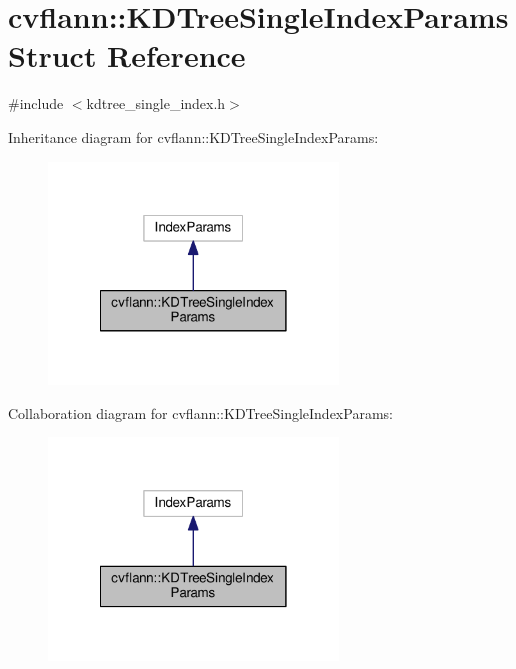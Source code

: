 \hypertarget{structcvflann_1_1KDTreeSingleIndexParams}{\section{cvflann\-:\-:K\-D\-Tree\-Single\-Index\-Params Struct Reference}
\label{structcvflann_1_1KDTreeSingleIndexParams}
}


{\ttfamily \#include $<$kdtree\-\_\-single\-\_\-index.\-h$>$}



Inheritance diagram for cvflann\-:\-:K\-D\-Tree\-Single\-Index\-Params\-:\nopagebreak
\begin{figure}[H]
\begin{center}
\leavevmode
\includegraphics[width=218pt]{structcvflann_1_1KDTreeSingleIndexParams__inherit__graph}
\end{center}
\end{figure}


Collaboration diagram for cvflann\-:\-:K\-D\-Tree\-Single\-Index\-Params\-:\nopagebreak
\begin{figure}[H]
\begin{center}
\leavevmode
\includegraphics[width=218pt]{structcvflann_1_1KDTreeSingleIndexParams__coll__graph}
\end{center}
\end{figure}
